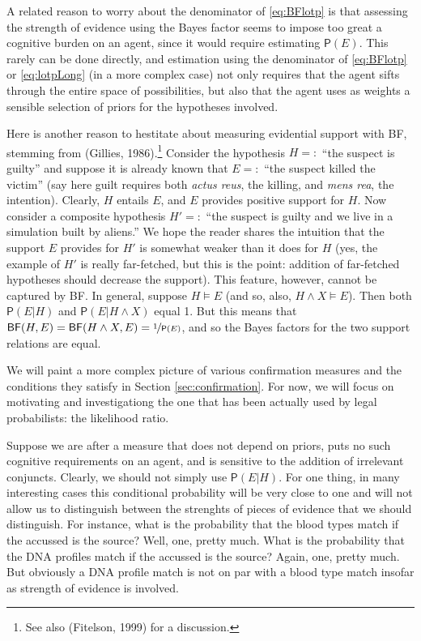 \documentclass[10pt,dvipsnames,enabledeprecatedfontcommands]{scrartcl}
\newcommand{\et}{\wedge}
\newcommand{\pr}[1]{\mathsf{P}(#1)}
\begin{document}
\noindent A related reason to worry about the denominator of
\eqref{eq:BFlotp} is that assessing the strength of evidence using the
Bayes factor seems to impose too great a cognitive burden on an agent,
since it would require estimating \(\pr{E}\). This rarely can be done
directly, and estimation using the denominator of \eqref{eq:BFlotp} or
\eqref{eq:lotpLong} (in a more complex case) not only requires that the
agent sifts through the entire space of possibilities, but also that the
agent uses as weights a sensible selection of priors for the hypotheses
involved.

Here is another reason to hestitate about measuring evidential support
with \textsf{BF}, stemming from (Gillies, 1986).\footnote{See also
  (Fitelson, 1999) for a discussion.} Consider the hypothesis \(H =:\)
``the suspect is guilty'' and suppose it is already known that \(E =:\)
``the suspect killed the victim'' (say here guilt requires both
\emph{actus reus}, the killing, and \emph{mens rea}, the intention).
Clearly, \(H\) entails \(E\), and \(E\) provides positive support for
\(H\). Now consider a composite hypothesis \(H'=:\) ``the suspect is
guilty and we live in a simulation built by aliens.'' We hope the reader
shares the intuition that the support \(E\) provides for \(H'\) is
somewhat weaker than it does for \(H\) (yes, the example of \(H'\) is
really far-fetched, but this is the point: addition of far-fetched
hypotheses should decrease the support). This feature, however, cannot
be captured by \textsf{BF}. In general, suppose \(H\models E\) (and so,
also, \(H \et X \models E\)). Then both \(\pr{E\vert H}\) and
\(\pr{E \vert H \et X}\) equal 1. But this means that
\(\mathsf{BF}(H,E) = \mathsf{BF}(H \et X, E) = \nicefrac{1}{\pr{E}}\),
and so the Bayes factors for the two support relations are equal.

We will paint a more complex picture of various confirmation measures
and the conditions they satisfy in Section \ref{sec:confirmation}. For
now, we will focus on motivating and investigationg the one that has
been actually used by legal probabilists: the likelihood ratio.

Suppose we are after a measure that does not depend on priors, puts no
such cognitive requirements on an agent, and is sensitive to the
addition of irrelevant conjuncts. Clearly, we should not simply use
\(\pr{E\vert H}\). For one thing, in many interesting cases this
conditional probability will be very close to one and will not allow us
to distinguish between the strenghts of pieces of evidence that we
should distinguish. For instance, what is the probability that the blood
types match if the accussed is the source? Well, one, pretty much. What
is the probability that the DNA profiles match if the accussed is the
source? Again, one, pretty much. But obviously a DNA profile match is
not on par with a blood type match insofar as strength of evidence is
involved.
\end{document}
